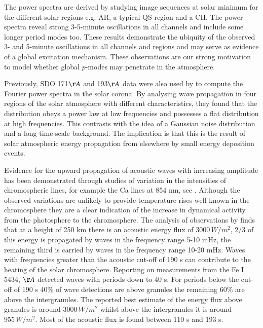 \documentclass[preprint,authoryear,12pt]{elsarticle}
\begin{document}
 The power spectra are derived by studying image sequences at solar minimum for the different solar regions e.g. AR, a typical QS region and a CH. The power spectra reveal strong 3-5-minute oscillations in all channels and include some longer period modes too. These results demonstrate the ubiquity of the observed 3- and 5-minute oscillations in all channels and regions and may serve as evidence of a global excitation mechanism. These observations are our strong motivation to model whether global $p$-modes may penetrate in the atmosphere. 

Previously, SDO 171$\AA$ and 193$\AA$ data were also used by \citet{Ireland2015} to compute the Fourier power spectra in the solar corona. By analysing wave propagation in four regions of the solar atmosphere with different characteristics, they found that the distribution obeys a power law at low frequencies and possesses a flat distribution at high frequencies. This contrasts with the idea of a Gaussian noise distribution and a long time-scale background. The implication is that this is the result of solar atmospheric energy propagation from elsewhere by small energy deposition events.

Evidence for the upward propagation of acoustic waves with increasing amplitude has been demonstrated through studies of variation in the intensities of chromospheric lines, for example the Ca lines at 854 nm, see  \citet{Beck2012}. Although the 
observed variations are unlikely to provide temperature rises well-known in the chromosphere they are a clear indication of the increase in dynamical activity from the photosphere to the chromosphere. The analysis of observations by  \citet{Bello2009} finds that at a height of 250 km there is an acoustic energy flux of $3000 \,W/m^2$,  2/3 of this energy is propagated by waves in the frequency range 5-10 mHz, the remaining third is carried by waves in the frequency range 10-20 mHz. Waves with frequencies greater than the acoustic cut-off of 190 s can contribute to the heating of the solar chromosphere. Reporting on measurements from the Fe I 5434, ${\AA}$ \citet{Bello2010A} detected waves with periods down to 40 s. For periods below the cut-off of 190 s 40\% of wave detections are above granules the remaining 60\% are above the intergranules. The reported best estimate of the energy flux above granules is around $3000 \, W/m^2$ whilst above the intergranules it is around $955 \, W/m^2$. Most of the acoustic flux is found between 110 s and 193 s.
\end{document}
